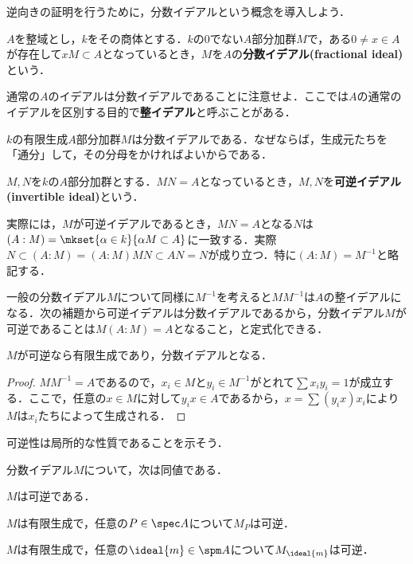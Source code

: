 逆向きの証明を行うために，分数イデアルという概念を導入しよう．

\begin{defi}[分数イデアル]
	$A$を整域とし，$k$をその商体とする．$k$の0でない$A$部分加群$M$で，ある$0\neq x\in A$が存在して$xM\subset A$となっているとき，$M$を$A$の\textbf{分数イデアル(fractional ideal)}という．
\end{defi}

通常の$A$のイデアルは分数イデアルであることに注意せよ．ここでは$A$の通常のイデアルを区別する目的で\textbf{整イデアル}と呼ぶことがある．

$k$の有限生成$A$部分加群$M$は分数イデアルである．なぜならば，生成元たちを「通分」して，その分母をかければよいからである．

\begin{defi}[可逆イデアル]
	$M,N$を$k$の$A$部分加群とする．$MN=A$となっているとき，$M,N$を\textbf{可逆イデアル(invertible ideal)}という．
\end{defi}
	実際には，$M$が可逆イデアルであるとき，$MN=A$となる$N$は$(A:M)=\mkset{\alpha\in k}{\alpha M\subset A}$に一致する．実際$N\subset (A:M)=(A:M)MN\subset AN=N$が成り立つ．特に$(A:M)=M^{-1}$と略記する．
	
	一般の分数イデアル$M$について同様に$M^{-1}$を考えると$MM^{-1}$は$A$の整イデアルになる．次の補題から可逆イデアルは分数イデアルであるから，分数イデアル$M$が可逆であることは$M(A:M)=A$となること，と定式化できる．

\begin{lem}
	$M$が可逆なら有限生成であり，分数イデアルとなる．
\end{lem}

\begin{proof}
	 $MM^{-1}=A$であるので，$x_i\in M$と$y_i\in M^{-1}$がとれて$\sum x_iy_i=1$が成立する．ここで，任意の$x\in M$に対して$y_ix\in A$であるから，$x=\sum(y_ix)x_i$により$M$は$x_i$たちによって生成される．
\end{proof}

可逆性は局所的な性質であることを示そう．
	
\begin{prop}\label{prop:可逆性は局所的}
	分数イデアル$M$について，次は同値である．
	\begin{sakura}
		\item $M$は可逆である．
		\item $M$は有限生成で，任意の$P\in\spec A$について$M_P$は可逆．
		\item $M$は有限生成で，任意の$\ideal{m}\in\spm A$について$M_{\ideal{m}}$は可逆．
	\end{sakura}
\end{prop}


